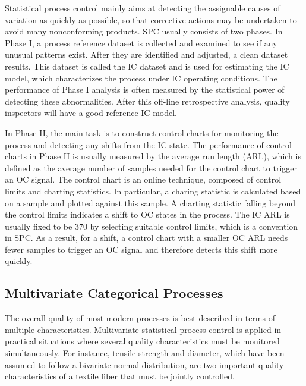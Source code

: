 Statistical process control mainly aims at detecting the assignable causes of
variation as quickly as possible, so that corrective actions may be undertaken to
avoid many nonconforming products. SPC usually consists of two phases. In Phase I, a
process reference dataset is collected and examined to see if any unusual patterns
exist. After they are identified and adjusted, a clean dataset results. This dataset
is called the IC dataset and is used for estimating the IC model, which
characterizes the process under IC operating conditions. The performance of Phase I
analysis is often measured by the statistical power of detecting these
abnormalities. After this off-line retrospective analysis, quality inspectors will
have a good reference IC model.

In Phase II, the main task is to construct control charts for monitoring the process
and detecting any shifts from the IC state. The performance of control charts in
Phase II is usually measured by the average run length (ARL), which is defined as
the average number of samples needed for the control chart to trigger an OC signal.
The control chart is an online technique, composed of control limits and charting
statistics. In particular, a charing statistic is calculated based on a sample and
plotted against this sample. A charting statistic falling beyond the control limits
indicates a shift to OC states in the process. The IC ARL is usually fixed to be 370
by selecting suitable control limits, which is a convention in SPC. As a result, for
a shift, a control chart with a smaller OC ARL needs fewer samples to trigger an OC
signal and therefore detects this shift more quickly.



\subsection{Multivariate Categorical Processes}

The overall quality of most modern processes is best described in terms of multiple
characteristics. Multivariate statistical process control is applied in practical
situations where several quality characteristics must be monitored simultaneously.
For instance, tensile strength and diameter, which have been assumed to follow a
bivariate normal distribution, are two important quality characteristics of a
textile fiber that must be jointly controlled.

